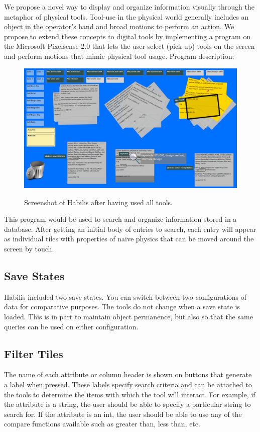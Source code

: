 \documentclass{article}
\begin{document}
We propose a novel way to display and organize information visually through the metaphor of physical tools. Tool-use in the physical world generally includes an object in the operator's hand and broad motions to perform an action. We propose to extend these concepts to digital tools by implementing a program on the Microsoft Pixelsense 2.0 that lets the user select (pick-up) tools on the screen and perform motions that mimic physical tool usage. 
Program description:

\begin{figure}[t!]
\centering
\scalebox{.239}
{\includegraphics{HabilisScreenShot.png}}
\caption{Screenshot of Habilis after having used all tools.}
\label{Fig:screenshot}
\end{figure}



This program would be used to search and organize information stored in a database.  After getting an initial body of entries to search, each entry will appear as individual tiles with properties of naive physics that can be moved around the screen by touch. 






\subsection{Save States}
Habilis included two save states.  You can switch between two configurations of data for comparative purposes.  The tools do not change when a save state is loaded.  This is in part to maintain object permanence, but also so that the same queries can be used on either configuration.  

\subsection{Filter Tiles}
The name of each attribute or column header is shown on buttons that generate a label when pressed. These labels specify search criteria and can be attached to the tools to determine the items with which the tool will interact. For example, if the attribute is a string, the user should be able to specify a particular string to search for. If the attribute is an int, the user should be able to use any of the compare functions available such as greater than, less than, etc. 
\end{document}
